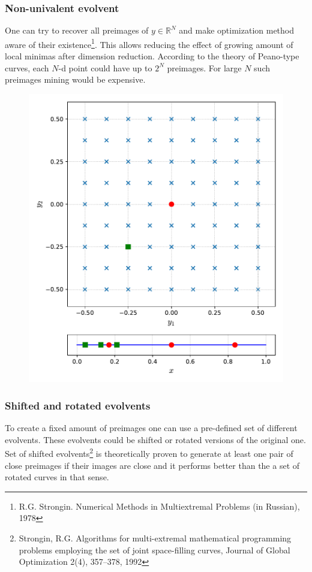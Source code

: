 \documentclass[aspectratio=1610]{beamer}
\begin{document}
\begin{frame}
  \frametitle{Non-univalent evolvent}
    One can try to recover all preimages of \(y\in\mathbb{R}^N\) and make optimization method aware of their existence\footnote{R.G. Strongin. Numerical Methods in Multiextremal Problems (in Russian), 1978}. This allows reducing the effect of growing amount of local minimas after dimension reduction.
    According to the theory of Peano-type curves, each \(N\)-d point could have up to \(2^N\) preimages. For large \(N\) such preimages mining would be expensive.
      \begin{figure}[ht]
        \includegraphics[width=.25\textwidth]{noninjective.pdf}
      \end{figure}
\end{frame}

\begin{frame}
  \frametitle{Shifted and rotated evolvents}
  To create a fixed amount of preimages one can use a pre-defined set of different evolvents. These evolvents could be shifted or rotated versions of the original one. Set of shifted evolvents\footnote{Strongin, R.G. Algorithms for multi-extremal mathematical programming problems employing the set of joint space-filling curves, Journal of Global Optimization 2(4), 357--378, 1992} is theoretically proven to generate at least one pair of close preimages if their images are close and it performs better than the a set of rotated curves in that sense.
  \begin{figure}[ht]
  \end{figure}
\end{frame}
\end{document}
